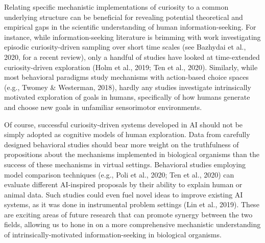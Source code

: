 Relating specific mechanistic implementations of curiosity to a common underlying structure can be beneficial for revealing potential theoretical and empirical gaps in the scientific understanding of human information-seeking. For instance, while information-seeking literature is brimming with work investigating episodic curiosity-driven sampling over short time scales (see Bazhydai et al., 2020, for a recent review), only a handful of studies have looked at time-extended curiosity-driven exploration (Holm et al., 2019; Ten et al., 2020). Similarly, while most behavioral paradigms study mechanisms with action-based choice spaces (e.g., Twomey \& Westerman, 2018), hardly any studies investigate intrinsically motivated exploration of goals in humans, specifically of how humans generate and choose new goals in unfamiliar sensorimotor environments.

Of course, successful curiosity-driven systems developed in AI should not be simply adopted as cognitive models of human exploration. Data from carefully designed behavioral studies should bear more weight on the truthfulness of propositions about the mechanisms implemented in biological organisms than the success of these mechanisms in virtual settings. Behavioral studies employing model comparison techniques (e.g., Poli et al., 2020; Ten et al., 2020) can evaluate different AI-inspired proposals by their ability to explain human or animal data. Such studies could even fuel novel ideas to improve existing AI systems, as it was done in instrumental problem settings (Lin et al., 2019). These are exciting areas of future research that can promote synergy between the two fields, allowing us to hone in on a more comprehensive mechanistic understanding of intrinsically-motivated information-seeking in biological organisms.
    
